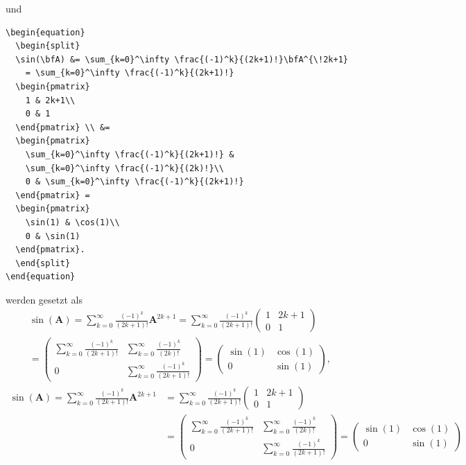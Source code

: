 \documentclass[12pt]{article}
\theoremstyle{definition}
\numberwithin{equation}{section}
\newcommand{\bfA}{\mathbf{A}}
\begin{document}
und
\begin{verbatim}
\begin{equation}
  \begin{split}
  \sin(\bfA) &= \sum_{k=0}^\infty \frac{(-1)^k}{(2k+1)!}\bfA^{\!2k+1}
    = \sum_{k=0}^\infty \frac{(-1)^k}{(2k+1)!}
  \begin{pmatrix}
    1 & 2k+1\\
    0 & 1
  \end{pmatrix} \\ &=
  \begin{pmatrix}
    \sum_{k=0}^\infty \frac{(-1)^k}{(2k+1)!} &
    \sum_{k=0}^\infty \frac{(-1)^k}{(2k)!}\\
    0 & \sum_{k=0}^\infty \frac{(-1)^k}{(2k+1)!}
  \end{pmatrix} =
  \begin{pmatrix}
    \sin(1) & \cos(1)\\
    0 & \sin(1)
  \end{pmatrix}.
  \end{split}
\end{equation}
\end{verbatim}
werden gesetzt als
\begin{multline}
  \sin(\bfA) = \sum_{k=0}^\infty \frac{(-1)^k}{(2k+1)!}\bfA^{\!2k+1}
    = \sum_{k=0}^\infty \frac{(-1)^k}{(2k+1)!}
  \begin{pmatrix}
    1 & 2k+1\\
    0 & 1
  \end{pmatrix} \\ =
  \begin{pmatrix}
    \sum_{k=0}^\infty \frac{(-1)^k}{(2k+1)!} &
    \sum_{k=0}^\infty \frac{(-1)^k}{(2k)!}\\
    0 & \sum_{k=0}^\infty \frac{(-1)^k}{(2k+1)!}
  \end{pmatrix} =
  \begin{pmatrix}
    \sin(1) & \cos(1)\\
    0 & \sin(1)
  \end{pmatrix},
\end{multline}
\begin{align}
  \sin(\bfA) = \sum_{k=0}^\infty \frac{(-1)^k}{(2k+1)!}\bfA^{\!2k+1}
   &= \sum_{k=0}^\infty \frac{(-1)^k}{(2k+1)!}
  \begin{pmatrix}
    1 & 2k+1\\
    0 & 1
  \end{pmatrix} \\ &=
  \begin{pmatrix}
    \sum_{k=0}^\infty \frac{(-1)^k}{(2k+1)!} &
    \sum_{k=0}^\infty \frac{(-1)^k}{(2k)!}\\
    0 & \sum_{k=0}^\infty \frac{(-1)^k}{(2k+1)!}
  \end{pmatrix} =
  \begin{pmatrix}
    \sin(1) & \cos(1)\\
    0 & \sin(1)
  \end{pmatrix}
\end{align}
\end{document}
